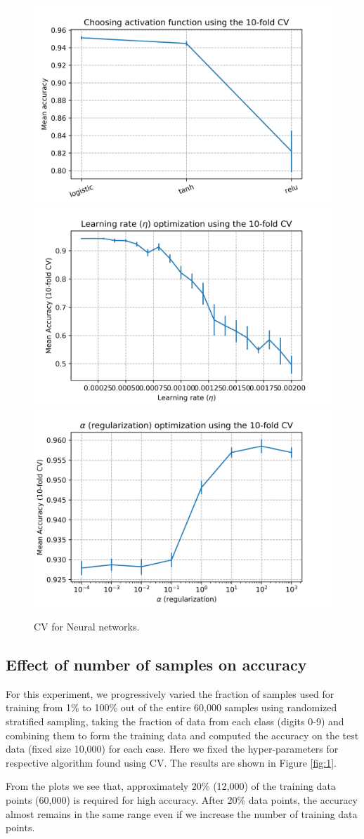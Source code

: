 \documentclass[10pt]{scrartcl}
\begin{document}
\begin{figure}[H]
\centering
\includegraphics[width=0.33\linewidth]{figures/Neural_net_act_fcn_mean_acc_error_bar.png}%
\includegraphics[width=0.33\linewidth]{figures/Neural_net_learn_rate_mean_acc_error_bar.png}%
\includegraphics[width=0.33\linewidth]{figures/Neural_net_alpha_mean_acc_error_bar.png}
\caption{CV for Neural networks. \label{fig:nn_cv}}
\end{figure}

\subsection*{Effect of number of samples on accuracy}
For this experiment,  we progressively varied the fraction of samples used for training from 1\% to 100\% out of the entire 60,000 samples using randomized stratified sampling, taking the fraction of data from each class (digits 0-9) and combining them to form the training data and computed the accuracy on the test data (fixed size 10,000) for each case. Here we fixed the hyper-parameters for respective algorithm found using CV. The results are shown in Figure \ref{fig:1}.

From the plots we see that, approximately 20\% (12,000) of the training data points (60,000) is required for high accuracy. After 20\% data points, the accuracy 
almost remains in the same range even if we increase the number of training data points.
\end{document}
